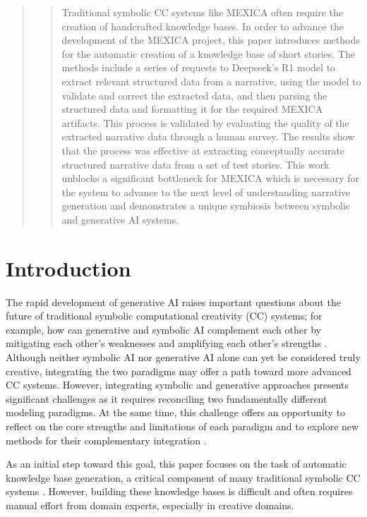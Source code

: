 \documentclass[phd,electronic,oneside,twosidetoc,letterpaper,chaptercenter,parttop,lof]{byumsphd}
\begin{document}
\begin{abstract}
\begin{quote}

Traditional symbolic CC systems like MEXICA often require the creation of handcrafted knowledge bases. In order to advance the development of the MEXICA project, this paper introduces methods for the automatic creation of a knowledge base of short stories. The methods include a series of requests to Deepseek's R1 model to extract relevant structured data from a narrative, using the model to validate and correct the extracted data, and then parsing the structured data and formatting it for the required MEXICA artifacts. This process is validated by evaluating the quality of the extracted narrative data through a human survey. The results show that the process was effective at extracting conceptually accurate structured narrative data from a set of test stories. This work unblocks a significant bottleneck for MEXICA which is necessary for the system to advance to the next level of understanding narrative generation and demonstrates a unique symbiosis between symbolic and generative AI systems.

\end{quote}
\end{abstract}

\section{Introduction}
The rapid development of generative AI raises important questions about the future of traditional symbolic computational creativity (CC) systems; for example, how can generative and symbolic AI complement each other by mitigating each other's weaknesses and amplifying each other's strengths \cite{veale2024symbolic}. Although neither symbolic AI nor generative AI alone can yet be considered truly creative, integrating the two paradigms may offer a path toward more advanced CC systems.  However, integrating symbolic and generative approaches presents significant challenges as it requires reconciling two fundamentally different modeling paradigms. At the same time, this challenge offers an opportunity to reflect on the core strengths and limitations of each paradigm and to explore new methods for their complementary integration \cite{perez2023narrative}.

As an initial step toward this goal, this paper focuses on the task of automatic knowledge base generation, a critical component of many traditional symbolic CC systems \cite{ventura2017howto}. However, building these knowledge bases is difficult and often requires manual effort from domain experts, especially in creative domains.
\end{document}
